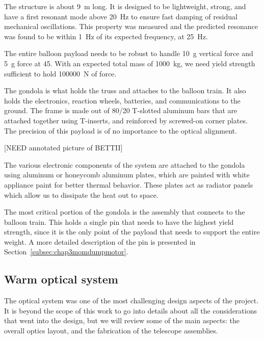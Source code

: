 The structure is about \SI{9}{\meter} long. It is designed to be lightweight, strong, and have a first resonant mode above \SI{20}{\hertz} to ensure fast damping of residual mechanical oscillations. This property was measured and the predicted resonance was found to be within \SI{1}{\hertz} of its expected frequency, at \SI{25}{\hertz}.


The entire balloon payload needs to be robust to handle 10~g vertical force and 5~g force at \SI{45}{\deg}. With an expected total mass of \SI{1000}{\kilo\gram}, we need yield strength sufficient to hold \SI{100000}{\newton} of force. 

The gondola is what holds the truss and attaches to the balloon train. It also holds the electronics, reaction wheels, batteries, and communications to the ground. The frame is made out of 80/20 T-slotted aluminum bars that are attached together using T-inserts, and reinforced by screwed-on corner plates. The precision of this payload is of no importance to the optical alignment. 

[NEED annotated picture of BETTII]

The various electronic components of the system are attached to the gondola using aluminum or honeycomb aluminum plates, which are painted with white appliance paint for better thermal behavior. These plates act as radiator panels which allow us to dissipate the heat out to space.

The most critical portion of the gondola is the assembly that connects to the balloon train. This holds a single pin that needs to have the highest yield strength, since it is the only point of the payload that needs to support the entire weight. A more detailed description of the pin is presented in Section~\ref{subsec:chap3momdumpmotor}.



\subsection{Warm optical system}

The optical system was one of the most challenging design aspects of the project. It is beyond the scope of this work to go into details about all the considerations that went into the design, but we will review some of the main aspects: the overall optics layout, and the fabrication of the telescope assemblies.

